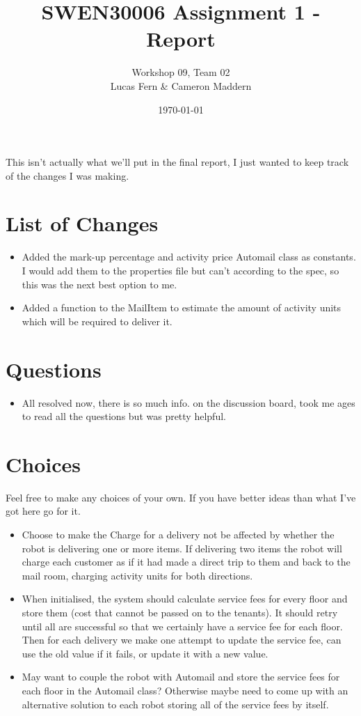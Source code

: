 \documentclass{article}
\title{SWEN30006 Assignment 1 - Report}
\date{\today}
\author{Workshop 09, Team 02\\Lucas Fern \& Cameron Maddern}
\begin{document}
\maketitle
\noindent This isn't actually what we'll put in the final report, I just wanted to keep track of the changes I was making.
\section{List of Changes}
\begin{itemize}
    \item Added the mark-up percentage and activity price Automail class as constants. I would add them to the properties file but can't according to the spec, so this was the next best option to me.
    \item Added a function to the MailItem to estimate the amount of activity units which will be required to deliver it.
\end{itemize}
\section{Questions}
\begin{itemize}
    \item All resolved now, there is so much info. on the discussion board, took me ages to read all the questions but was pretty helpful.
\end{itemize}
\section{Choices}
Feel free to make any choices of your own. If you have better ideas than what I've got here go for it.
\begin{itemize}
    \item Choose to make the Charge for a delivery not be affected by whether the robot is delivering one or more items. If delivering two items the robot will charge each customer as if it had made a direct trip to them and back to the mail room, charging activity units for both directions.
    \item When initialised, the system should calculate service fees for every floor and store them (cost that cannot be passed on to the tenants). It should retry until all are successful so that we certainly have a service fee for each floor. Then for each delivery we make one attempt to update the service fee, can use the old value if it fails, or update it with a new value.
    \item May want to couple the robot with Automail and store the service fees for each floor in the Automail class? Otherwise maybe need to come up with an alternative solution to each robot storing all of the service fees by itself.
\end{itemize}
\end{document}
